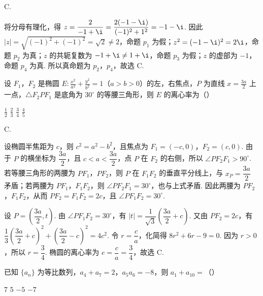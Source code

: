 \begin{answer}
C.
\end{answer}

\begin{solution}
将分母有理化，得 \(z=\dfrac{2}{-1+\i}=\dfrac{2(-1-\i)}{(-1)^2+1^2}=-1-\i\). 因此 \(|z|=\sqrt{(-1)^2+(-1)^2}=\sqrt2\ne2\)，命题 \(p_1\) 为假；\(z^2=(-1-\i)^2=2\i\)，命题 \(p_2\) 为真；\(z\) 的共轭复数为 \(-1+\i\ne1+\i\)，命题 \(p_3\) 为假；\(z\) 的虚部为 \(-1\)，命题 \(p_4\) 为真. 所以真命题为 \(p_2\)，\(p_4\)，故选 C.
\end{solution}

\begin{problem}
设 \(F_{1}\)，\(F_{2}\) 是椭圆 \(E: \frac{x^{2}}{a^{2}} + \frac{y^{2}}{b^{2}} = 1\)（\(a > b > 0\)）的左，右焦点，\(P\) 为直线 \(x = \frac{3a}{2}\) 上一点，\(\triangle F_{2}PF_{1}\) 是底角为 \(30^{\circ}\) 的等腰三角形，则 \(E\) 的离心率为（\quad）

\choices
    {\( \frac{1}{2} \)}
    {\( \frac{2}{3} \)}
    {\( \frac{3}{4} \)}
    {\( \frac{4}{5} \)}
\end{problem}

\begin{answer}
C.
\end{answer}

\begin{solution}
设椭圆半焦距为 \(c\)，则 \(c^2=a^2-b^2\)，且焦点为 \(F_1=(-c,0)\)，\(F_2=(c,0)\). 由于 \(P\) 的横坐标为 \(\dfrac{3a}{2}\)，且 \(c<a<\dfrac{3a}{2}\)，点 \(P\) 在 \(F_2\) 的右侧，所以 \(\angle PF_2F_1>90^\circ\). 若等腰三角形的两腰为 \(PF_1\)，\(PF_2\)，则 \(P\) 在 \(F_1F_2\) 的垂直平分线上，与 \(x_P=\dfrac{3a}{2}\) 矛盾；若两腰为 \(PF_1\)，\(F_1F_2\)，则 \(\angle PF_2F_1=30^\circ\)，也与上式矛盾. 因此两腰为 \(PF_2\)，\(F_1F_2\)，从而 \(PF_2=F_1F_2=2c\)，且 \(\angle PF_1F_2=30^\circ\).

设 \(P=\left(\dfrac{3a}{2},t\right)\). 由 \(\angle PF_1F_2=30^\circ\)，有 \(|t|=\dfrac{1}{\sqrt3}\left(\dfrac{3a}{2}+c\right)\). 又由 \(PF_2=2c\)，有 \(\dfrac{1}{3}\left(\dfrac{3a}{2}+c\right)^2+\left(\dfrac{3a}{2}-c\right)^2=4c^2\). 令 \(r=\dfrac ca\)，化简得 \(8r^2+6r-9=0\). 因为 \(r>0\)，所以 \(r=\dfrac34\). 椭圆的离心率为 \(e=\dfrac ca=\dfrac34\)，故选 C.
\end{solution}

\begin{problem}
已知 \(\{a_{n}\}\) 为等比数列，\(a_{4} + a_{7} = 2\)，\(a_{5}a_{6} = -8\)，则 \(a_{1} + a_{10} =\)（\quad）

\choices
    {\(7\)}
    {\(5\)}
    {\(-5\)}
    {\(-7\)}
\end{problem}

